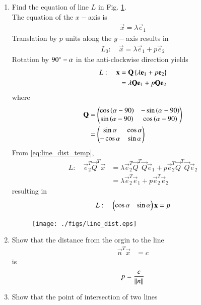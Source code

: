 \begin{enumerate}[label=\arabic*.,ref=\thesubsection.\theenumi]
%
\item Find the equation of  line $L$ in Fig. \ref{fig:line_dist}.
\\
\solution The equation of the $x-$axis is
\begin{align}
\vec{x} =\lambda \vec{e}_1
\end{align}
Translation by $p$ units along the $y-$axis results in 
\begin{align}
L_0: \quad \vec{x} = \lambda \vec{e}_1 + p \vec{e}_2 
\end{align}
Rotation by $90\degree-\alpha$ in the anti-clockwise direction yields
\begin{align}
L: \quad \mathbf{x} &= \mathbf{Q}\left\{\lambda \mathbf{e}_1 + p \mathbf{e}_2 \right\}
\\
&=\lambda \mathbf{Q}\mathbf{e}_1 + p \mathbf{Q}\mathbf{e}_2 
\label{eq:line_dist_temp}
\end{align}
%
where 
\begin{align}
\mathbf{Q} &= \begin{pmatrix}\cos \left(\alpha-90\right) & -\sin \left(\alpha-90\right)\\ \sin \left(\alpha-90\right) & \cos \left(\alpha-90\right)\end{pmatrix}
\\
&= \begin{pmatrix}\sin \alpha & \cos \alpha \\ -\cos \alpha & \sin \alpha\end{pmatrix}
\end{align}
%
From \eqref{eq:line_dist_temp},
\begin{align}
L: \quad \vec{e}_2^T\vec{Q}^T\vec{x}&=\lambda \vec{e}_2^T\vec{Q}^T\vec{Q}\vec{e}_1 + p \vec{e}_2^T\vec{Q}^T\vec{Q}\vec{e}_2 
\nonumber \\
&=\lambda \vec{e}_2^T\vec{e}_1 + p \vec{e}_2^T\vec{e}_2 
\end{align}
resulting in 
\begin{align}
L: \quad \begin{pmatrix}\cos \alpha & \sin \alpha\end{pmatrix}\mathbf{x}=p
\label{eq:line_dist_temp_final}
\end{align}
\begin{figure}
\centering
\texttt{[image: ./figs/line\_dist.eps]}
\caption{}
\label{fig:line_dist}
\end{figure}
\item Show that the distance from the orgin to the line 
\begin{align}
\vec{n}^T\vec{x} &=c
\end{align}
is 
\begin{align}
p = \frac{c}{\lVert n\rVert}
\label{eq:line_dist_orig}
\end{align}
\item Show that the point of intersection of two lines 

\end{enumerate}
